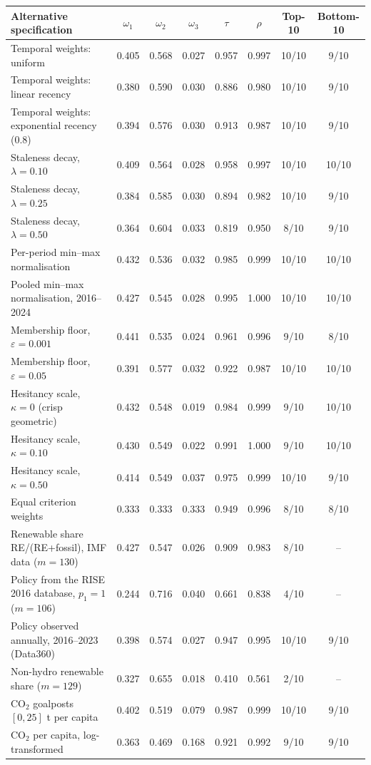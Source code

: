 \begin{tabular}{lccccccc}
\toprule
Alternative specification & $\omega_1$ & $\omega_2$ & $\omega_3$ & $\tau$ & $\rho$ & Top-10 & Bottom-10 \\
\midrule
Temporal weights: uniform & 0.405 & 0.568 & 0.027 & 0.957 & 0.997 & 10/10 & 9/10 \\
Temporal weights: linear recency & 0.380 & 0.590 & 0.030 & 0.886 & 0.980 & 10/10 & 9/10 \\
Temporal weights: exponential recency (0.8) & 0.394 & 0.576 & 0.030 & 0.913 & 0.987 & 10/10 & 9/10 \\
Staleness decay, $\lambda=0.10$ & 0.409 & 0.564 & 0.028 & 0.958 & 0.997 & 10/10 & 10/10 \\
Staleness decay, $\lambda=0.25$ & 0.384 & 0.585 & 0.030 & 0.894 & 0.982 & 10/10 & 9/10 \\
Staleness decay, $\lambda=0.50$ & 0.364 & 0.604 & 0.033 & 0.819 & 0.950 & 8/10 & 9/10 \\
Per-period min--max normalisation & 0.432 & 0.536 & 0.032 & 0.985 & 0.999 & 10/10 & 10/10 \\
Pooled min--max normalisation, 2016--2024 & 0.427 & 0.545 & 0.028 & 0.995 & 1.000 & 10/10 & 10/10 \\
Membership floor, $\varepsilon=0.001$ & 0.441 & 0.535 & 0.024 & 0.961 & 0.996 & 9/10 & 8/10 \\
Membership floor, $\varepsilon=0.05$ & 0.391 & 0.577 & 0.032 & 0.922 & 0.987 & 10/10 & 10/10 \\
Hesitancy scale, $\kappa=0$ (crisp geometric) & 0.432 & 0.548 & 0.019 & 0.984 & 0.999 & 9/10 & 10/10 \\
Hesitancy scale, $\kappa=0.10$ & 0.430 & 0.549 & 0.022 & 0.991 & 1.000 & 9/10 & 10/10 \\
Hesitancy scale, $\kappa=0.50$ & 0.414 & 0.549 & 0.037 & 0.975 & 0.999 & 10/10 & 9/10 \\
Equal criterion weights & 0.333 & 0.333 & 0.333 & 0.949 & 0.996 & 8/10 & 8/10 \\
Renewable share RE/(RE+fossil), IMF data ($m=130$) & 0.427 & 0.547 & 0.026 & 0.909 & 0.983 & 8/10 & -- \\
Policy from the RISE 2016 database, $p_1=1$ ($m=106$) & 0.244 & 0.716 & 0.040 & 0.661 & 0.838 & 4/10 & -- \\
Policy observed annually, 2016--2023 (Data360) & 0.398 & 0.574 & 0.027 & 0.947 & 0.995 & 10/10 & 9/10 \\
Non-hydro renewable share ($m=129$) & 0.327 & 0.655 & 0.018 & 0.410 & 0.561 & 2/10 & -- \\
CO$_2$ goalposts $[0,25]$ t per capita & 0.402 & 0.519 & 0.079 & 0.987 & 0.999 & 10/10 & 9/10 \\
CO$_2$ per capita, log-transformed & 0.363 & 0.469 & 0.168 & 0.921 & 0.992 & 9/10 & 9/10 \\
\bottomrule
\end{tabular}
